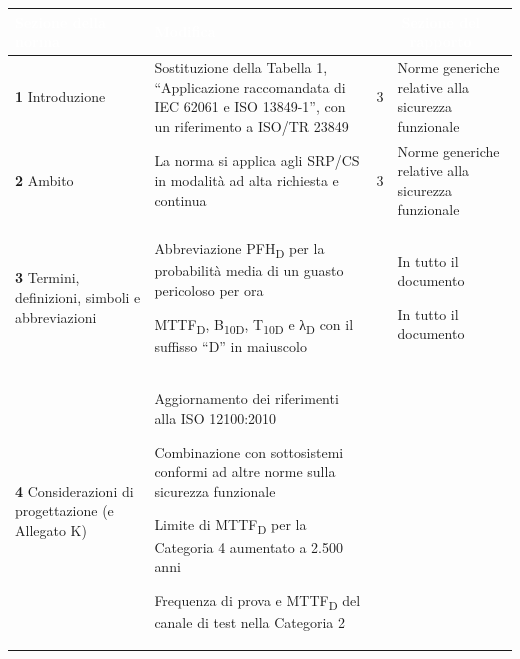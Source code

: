 \newpage
\begingroup
{}
\fontsize{9}{11}\selectfont
\setlength{\tabcolsep}{4pt}
\captionsetup{hypcap=false}
\renewcommand{\arraystretch}{1.0}
\label{tab:04-2}
\begin{tabularx}{\textwidth}{|p{2.6cm}|p{7.8cm}|p{1.3cm}X|}
    \hline
    \rowcolor{tabblue}
    \textcolor{white}{\textbf{Sezione della norma}} & \textcolor{white}{\textbf{Modifica}} & \multicolumn{2}{c|}{\textcolor{white}{\textbf{Sezione del rapporto}}} \\
    \hline
    \textbf{1} \newline Introduzione &
    Sostituzione della Tabella 1, ``Applicazione raccomandata di IEC 62061 e ISO 13849-1'', con un riferimento a ISO/TR 23849 &
    3 & Norme generiche relative alla sicurezza funzionale \\
    \hline
    \rowcolor{black!8}
    \textbf{2} \newline Ambito &
    La norma si applica agli SRP/CS in modalità ad alta richiesta e continua &
    3 & Norme generiche relative alla sicurezza funzionale \\
    \hline
    \textbf{3} \newline Termini, definizioni, simboli e abbreviazioni &
    Abbreviazione PFH\textsubscript{D} per la probabilità media di un guasto pericoloso per ora
    \par\vspace{3pt}
    MTTF\textsubscript{D}, B\textsubscript{10D}, T\textsubscript{10D} e λ\textsubscript{D} con il suffisso ``D'' in maiuscolo &
    &
    In tutto il documento
    \par\vspace{3pt}
    In tutto il documento \\
    \hline
    \rowcolor{black!8}
    \textbf{4} \newline Considerazioni di progettazione (e Allegato K) &
    Aggiornamento dei riferimenti alla ISO 12100:2010
    \par\vspace{3pt}
    Combinazione con sottosistemi conformi ad altre norme sulla sicurezza funzionale
    \par\vspace{3pt}
    Limite di MTTF\textsubscript{D} per la Categoria 4 aumentato a 2.500 anni
    \par\vspace{3pt}
    Frequenza di prova e MTTF\textsubscript{D} del canale di test nella Categoria 2

\end{tabularx}
